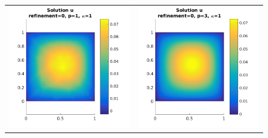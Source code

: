 \documentclass{article}
\begin{document}
\begin{figure}[!ht]
\centering
\begin{tabular}{c c}
\includegraphics[scale=0.7]{umu_111.png} & 
\includegraphics[scale=0.7]{umu_211.png} \\

\end{tabular}
\end{figure}
\end{document}
